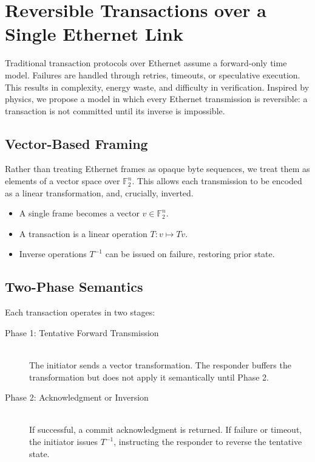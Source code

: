 \documentclass[../../../OAE-SPEC-MAIN.tex]{subfiles}
\begin{document}
\section{Reversible Transactions over a Single Ethernet Link}

Traditional transaction protocols over Ethernet assume a forward-only time model. Failures are handled through retries, timeouts, or speculative execution. This results in complexity, energy waste, and difficulty in verification. Inspired by physics, we propose a model in which every Ethernet transmission is reversible: a transaction is not committed until its inverse is impossible.

\subsection*{Vector-Based Framing}

Rather than treating Ethernet frames as opaque byte sequences, we treat them as elements of a vector space over $\mathbb{F}_2^n$. This allows each transmission to be encoded as a linear transformation, and, crucially, inverted.

\begin{itemize}
  \item A single frame becomes a vector $v \in \mathbb{F}_2^n$.
  \item A transaction is a linear operation $T: v \mapsto Tv$.
  \item Inverse operations $T^{-1}$ can be issued on failure, restoring prior state.
\end{itemize}

\subsection*{Two-Phase Semantics}

Each transaction operates in two stages:

\begin{description}
  \item[Phase 1: Tentative Forward Transmission] \hfill \\
  The initiator sends a vector transformation. The responder buffers the transformation but does not apply it semantically until Phase 2.
  
  \item[Phase 2: Acknowledgment or Inversion] \hfill \\
  If successful, a commit acknowledgment is returned. If failure or timeout, the initiator issues $T^{-1}$, instructing the responder to reverse the tentative state.
\end{description}
\end{document}
